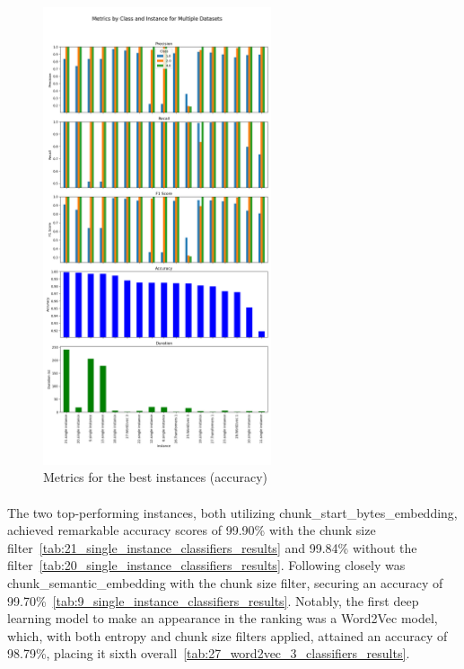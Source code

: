 \begin{figure}[ht]
    \centering
    \includegraphics[width=0.6\textwidth]{img/annexes/Best Accuracy (by instances).png}
    \caption{Metrics for the best instances (accuracy)}
    \label{fig:results:best_accuracy_instances}
\end{figure}

\paragraph{}The two top-performing instances, both utilizing chunk\_start\_bytes\_embedding, achieved remarkable accuracy scores of 99.90\% with the chunk size filter~\ref{tab:21_single_instance_classifiers_results} and 99.84\% without the filter~\ref{tab:20_single_instance_classifiers_results}. Following closely was chunk\_semantic\_embedding with the chunk size filter, securing an accuracy of 99.70\%~\ref{tab:9_single_instance_classifiers_results}. Notably, the first deep learning model to make an appearance in the ranking was a Word2Vec model, which, with both entropy and chunk size filters applied, attained an accuracy of 98.79\%, placing it sixth overall~\ref{tab:27_word2vec_3_classifiers_results}.


